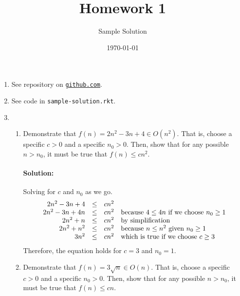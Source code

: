 \documentclass{article}
\title{Homework 1}
\author{Sample Solution}
\date{\today}
\begin{document}
\maketitle

\newcommand\link[2][http://]{\href{#1#2}{\nolinkurl{#2}}}
\newcommand\http[1]{\link[http://]{#1}}
\newcommand\https[1]{\link[https://]{#1}}
\newcommand\email[1]{\link[mailto:]{#1}}

\begin{enumerate}

\pagebreak[1]
\item See repository on \link{github.com}.

\pagebreak[1]
\item See code in \texttt{sample-solution.rkt}.

\pagebreak[1]
\item

  \begin{enumerate}

  \item Demonstrate that
    \(f(n) = 2n^2 - 3n + 4 \in O(n^2)\).
    That is, choose a specific \(c>0\) and a specific \(n_0 > 0\).
    Then, show that for any possible \(n > n_0\), it must be true that
    \(f(n) \leq c n^2\).

    \paragraph{Solution:} Solving for \(c\) and \(n_0\) as we go.
    \[
    \begin{array}{rcll}
      2n^2 - 3n + 4 &\leq& cn^2 \\
      2n^2 - 3n + 4n &\leq& cn^2
      & $because $ 4 \leq 4n $ if we choose $ n_0 \geq 1 \\
      2n^2 + n &\leq& cn^2
      & $by simplification$ \\
      2n^2 + n^2 &\leq& cn^2
      & $because $ n \leq n^2 $ given $ n_0 \geq 1 \\
      3n^2 &\leq& cn^2
      & $which is true if we choose $ c \geq 3
    \end{array}
    \]
    Therefore, the equation holds for \(c=3\) and \(n_0=1\).

    \bigskip

  \item Demonstrate that
    \(f(n) = 3 \sqrt{n} \in O(n)\).
    That is, choose a specific \(c>0\) and a specific \(n_0 > 0\).
    Then, show that for any possible \(n > n_0\), it must be true that
    \(f(n) \leq c n\).


\end{enumerate}
\end{enumerate}
\end{document}
